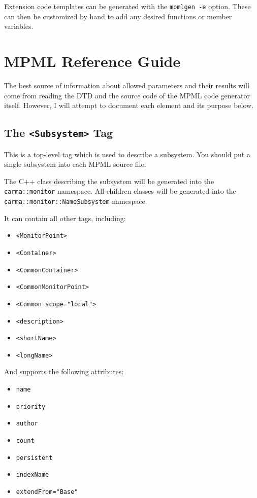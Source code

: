 \documentclass[letterpaper,12pt,oneside,pdftex]{article}
\newcommand{\mpml}[1]{\texttt{<#1>}}
\newcommand{\attr}[1]{\texttt{#1}}
\newenvironment{pitemize}{
\begin{itemize}
  \setlength{\itemsep}{1pt}
  \setlength{\parskip}{0pt}
  \setlength{\parsep}{0pt}
}{\end{itemize}}
\begin{document}
Extension code templates can be generated with the \texttt{mpmlgen -e} option.
These can then be customized by hand to add any desired functions or member
variables.

\section{MPML Reference Guide}

The best source of information about allowed parameters and their results will
come from reading the DTD and the source code of the MPML code generator itself.
However, I will attempt to document each element and its purpose below.

\subsection{The \mpml{Subsystem} Tag}

This is a top-level tag which is used to describe a subsystem. You should put a
single subsystem into each MPML source file.

The C++ class describing the subsystem will be generated into the
\texttt{carma::monitor} namespace. All children classes will be generated into
the \texttt{carma::monitor::NameSubsystem} namespace.

It can contain all other tags, including:

\begin{pitemize}
\item \mpml{MonitorPoint}
\item \mpml{Container}
\item \mpml{CommonContainer}
\item \mpml{CommonMonitorPoint}
\item \mpml{Common scope="local"}
\item \mpml{description}
\item \mpml{shortName}
\item \mpml{longName}
\end{pitemize}

And supports the following attributes:

\begin{pitemize}
\item \attr{name}
\item \attr{priority}
\item \attr{author}
\item \attr{count}
\item \attr{persistent}
\item \attr{indexName}
\item \attr{extendFrom="Base"}
\end{pitemize}
\end{document}
